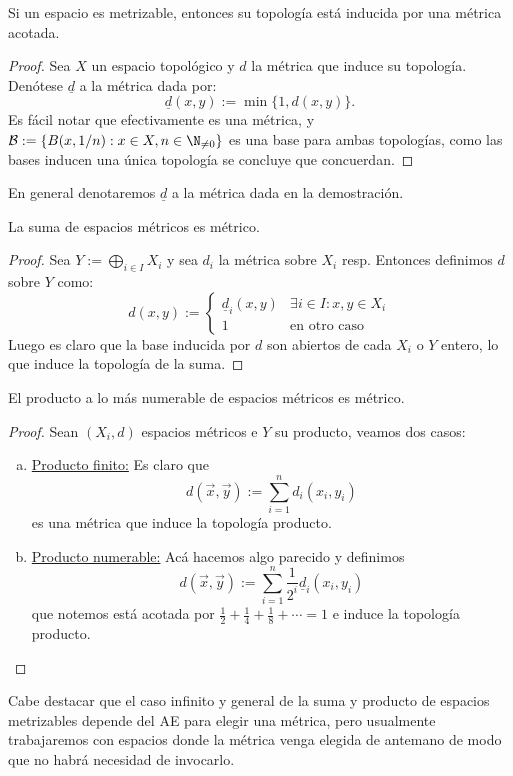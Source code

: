 \documentclass[topologia-analisis.tex]{subfiles}
\begin{document}
\begin{prop}
	Si un espacio es metrizable, entonces su topología está inducida por una métrica acotada.
\end{prop}
\begin{proof}
	Sea $X$ un espacio topológico y $d$ la métrica que induce su topología.
	Denótese $\underline{d}$ a la métrica dada por:
	$$ \underline{d}(x, y) := \min\{1, d(x, y)\}. $$
	Es fácil notar que efectivamente es una métrica, y $ \mathcal{B} := \{ B(x, 1/n) : x\in X, n\in\N_{\ne 0} \} $ es una base para ambas topologías,
	como las bases inducen una única topología se concluye que concuerdan.
\end{proof}
En general denotaremos $\underline{d}$ a la métrica dada en la demostración.

\begin{thm}
	La suma de espacios métricos es métrico.
\end{thm}
\begin{proof}
	Sea $Y := \bigoplus_{i\in I} X_i$ y sea $d_i$ la métrica sobre $X_i$ resp.
	Entonces definimos $d$ sobre $Y$ como:
	$$ d(x, y) :=
	\begin{cases}
		\underline{d}_i(x, y) & \exists i\in I : x,y\in X_i \\
		1		     & \text{en otro caso}
	\end{cases} $$
	Luego es claro que la base inducida por $d$ son abiertos de cada $X_i$ o $Y$ entero, lo que induce la topología de la suma.
\end{proof}

\begin{thm}
	El producto a lo más numerable de espacios métricos es métrico.
\end{thm}
\begin{proof}
	Sean $(X_i, d)$ espacios métricos e $Y$ su producto, veamos dos casos:
	\begin{enumerate}[a)]
		\item \underline{Producto finito:}
			Es claro que
			$$ d(\vec x, \vec y) := \sum_{i=1}^n d_i(x_i, y_i) $$
			es una métrica que induce la topología producto.

		\item \underline{Producto numerable:}
			Acá hacemos algo parecido y definimos
			$$ d(\vec x, \vec y) := \sum_{i=1}^n \frac{1}{2^i} \underline{d}_i(x_i, y_i) $$
			que notemos está acotada por $ \frac{1}{2} + \frac{1}{4} + \frac{1}{8} + \cdots = 1 $ e induce la topología producto. \qedhere
	\end{enumerate}
\end{proof}
Cabe destacar que el caso infinito y general de la suma y producto de espacios metrizables depende del AE para elegir una métrica,
pero usualmente trabajaremos con espacios donde la métrica venga elegida de antemano de modo que no habrá necesidad de invocarlo.
\end{document}
